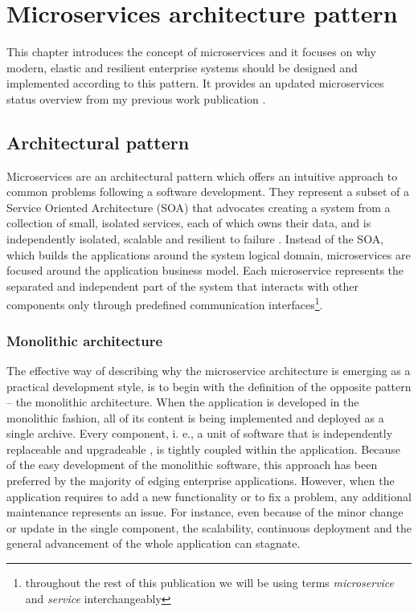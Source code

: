 \documentclass[oneside,
  digital, %
  table,   %
  nolof,     %
  nolot,     %
]{fithesis3}
\begin{document}
\clearpage
\chapter{Microservices architecture pattern}

This chapter introduces the concept of microservices and it focuses on why modern, elastic and resilient enterprise systems should be designed and implemented according to this pattern. It provides an updated microservices status overview from my previous work publication \cite{bachelor_thesis}.

\section{Architectural pattern}

Microservices are an architectural pattern which offers an intuitive approach to common problems following a software development. They represent a subset of a Service Oriented Architecture (SOA) \cite{soa} that advocates creating a system from a collection of small, isolated services, each of which owns their data, and is independently isolated, scalable and resilient to failure \cite{reactive_ms_arch}. Instead of the SOA, which builds the applications around the system logical domain, microservices are focused around the application business model. Each microservice represents the separated and independent part of the system that interacts with other components only through predefined communication interfaces\footnote{throughout the rest of this publication we will be using terms \textit{microservice} and \textit{service} interchangeably}.

\subsection{Monolithic architecture}

The effective way of describing why the microservice architecture is emerging as a practical development style, is to begin with the definition of the opposite pattern -- the monolithic architecture. When the application is developed in the monolithic fashion, all of its content is being implemented and deployed as a single archive. Every component, i. e., a unit of software that is independently replaceable and upgradeable \cite{microservices}, is tightly coupled within the application. Because of the easy development of the monolithic software, this approach has been preferred by the majority of edging enterprise applications. However, when the application requires to add a new functionality or to fix a problem, any additional maintenance represents an issue. For instance, even because of the minor change or update in the single component, the scalability, continuous deployment and the general advancement of the whole application can stagnate. 
\end{document}
